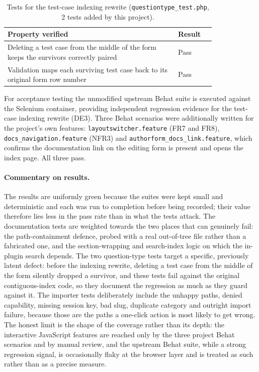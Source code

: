\begin{table}[h]
\centering
\small
\begin{tabular}{@{}p{0.82\linewidth} l@{}}
\toprule
\textbf{Property verified} & \textbf{Result} \\
\midrule
Deleting a test case from the middle of the form keeps the survivors correctly paired & Pass \\
Validation maps each surviving test case back to its original form row number & Pass \\
\bottomrule
\end{tabular}
\caption{Tests for the test-case indexing rewrite (\texttt{questiontype\_test.php}, 2 tests added by this project).}
\label{tab:tests-questiontype}
\end{table}

For acceptance testing the unmodified upstream Behat suite is executed against the Selenium container, providing independent regression evidence for the test-case indexing rewrite (DE3). Three Behat scenarios were additionally written for the project's own features: \texttt{layoutswitcher.feature} (FR7 and FR8), \texttt{docs\_navigation.feature} (NFR3) and \texttt{authorform\_docs\_link.feature}, which confirms the documentation link on the editing form is present and opens the index page. All three pass.

\paragraph{Commentary on results.} The results are uniformly green because the suites were kept small and deterministic and each was run to completion before being recorded; their value therefore lies less in the pass rate than in what the tests attack. The documentation tests are weighted towards the two places that can genuinely fail: the path-containment defence, probed with a real out-of-tree file rather than a fabricated one, and the section-wrapping and search-index logic on which the in-plugin search depends. The two question-type tests target a specific, previously latent defect: before the indexing rewrite, deleting a test case from the middle of the form silently dropped a survivor, and these tests fail against the original contiguous-index code, so they document the regression as much as they guard against it. The importer tests deliberately include the unhappy paths, denied capability, missing session key, bad slug, duplicate category and outright import failure, because those are the paths a one-click action is most likely to get wrong. The honest limit is the shape of the coverage rather than its depth: the interactive JavaScript features are reached only by the three project Behat scenarios and by manual review, and the upstream Behat suite, while a strong regression signal, is occasionally flaky at the browser layer and is treated as such rather than as a precise measure.

